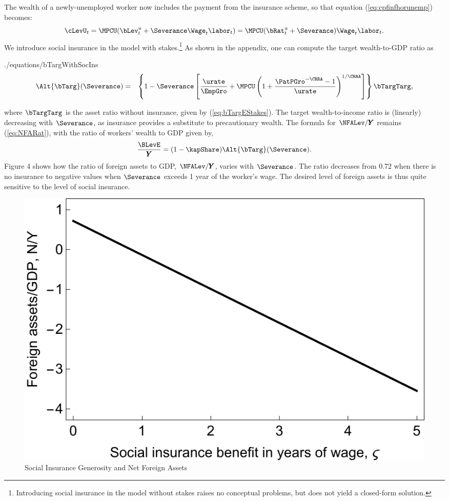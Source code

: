 \documentclass[titlepage]{\econtex}\newcommand{\texname}{cjSOE}
\renewcommand{\GDPLev}{\ensuremath{\pmb{Y}}}
\begin{document}
The wealth of a newly-unemployed worker now includes the payment from the insurance scheme, so that equation (\ref{eq:cpfinfhorunemp}) becomes:
\begin{equation*}
\cLevU_{t}=\MPCU (\bLev^{u}_t+\Severance \Wage_t \labor_t)=\MPCU (\bRat^{u}_t+\Severance)\Wage_t \labor_t.
\end{equation*}
We introduce social insurance in the model with stakes.\footnote{Introducing social insurance in the model without stakes raises no conceptual problems, but does not yield a closed-form solution.} As shown in the appendix, one can compute the target wealth-to-GDP ratio as
\begin{verbatimwrite}{./equations/bTargWithSocIns}
\begin{eqnarray}
\Alt{\bTarg}(\Severance) & = &
\left\{1-\Severance \left[\frac{\urate}{\EmpGro}+\MPCU \left(1+\frac{\PatPGro^{-\CRRA}-1}{\urate}\right)^{1/\CRRA}\right]\right\}\bTargTarg,
\label{eq:bTargWithSocIns}
\end{eqnarray}
\end{verbatimwrite}

where $\bTargTarg$ is the asset ratio without insurance, given by (\ref{eq:bTargEStakes}). The target wealth-to-income ratio is (linearly) decreasing with $\Severance$, as insurance provides a substitute to precautionary wealth. The formula for $\NFALev/\GDPLev$ remains (\ref{eq:NFARat}), with the ratio of workers' wealth to GDP given by,
\begin{equation}
\frac{\BLevE}{\GDPLev}=(1-\kapShare) \Alt{\bTarg}(\Severance).
\label{eq:STargWithSocIns}
\end{equation}
Figure 4 shows how the ratio of foreign assets to GDP, $\NFALev/\GDPLev$, varies with $\Severance$. The ratio decreases from 0.72 when there is no insurance to negative values when $\Severance$ exceeds 1 year of the worker's wage. The desired level of foreign assets is thus quite sensitive to the level of social insurance.

\medskip
\begin{figure}
\includegraphics{./Figures/socIns}
\caption{Social Insurance Generosity and Net Foreign Assets}\label{fig:socIns}
\end{figure}
\end{document}
